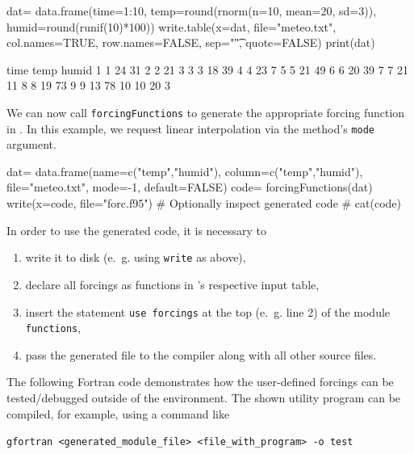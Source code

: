 \documentclass[times,onecolumn]{article}
\begin{document}
\begin{Schunk}
\begin{Sinput}
 dat= data.frame(time=1:10, temp=round(rnorm(n=10, mean=20, sd=3)),
   humid=round(runif(10)*100))
 write.table(x=dat, file="meteo.txt", col.names=TRUE,
   row.names=FALSE, sep="\t", quote=FALSE)
 print(dat)
\end{Sinput}
\begin{Soutput}
   time temp humid
1     1   24    31
2     2   21     3
3     3   18    39
4     4   23     7
5     5   21    49
6     6   20    39
7     7   21    11
8     8   19    73
9     9   13    78
10   10   20     3
\end{Soutput}
\end{Schunk}

We can now call \verb|forcingFunctions| to generate the  appropriate forcing function in . In this example, we request linear interpolation via the method's \verb|mode| argument.

\begin{Schunk}
\begin{Sinput}
 dat= data.frame(name=c("temp","humid"),
   column=c("temp","humid"), file="meteo.txt", mode=-1, default=FALSE)
 code= forcingFunctions(dat)
 write(x=code, file="forc.f95")
 # Optionally inspect generated code
 # cat(code)
\end{Sinput}
\end{Schunk}

In order to use the generated code, it is necessary to
\begin{enumerate}
\item write it to disk (e.~g. using \verb|write| as above),
\item declare all forcings as functions in 's respective input table,
\item insert the statement \verb|use forcings| at the top (e.~g. line 2) of the  module \verb|functions|,
\item pass the generated file to the compiler along with all other  source files.
\end{enumerate}

The following Fortran code demonstrates how the user-defined forcings can be tested/debugged outside of the  environment. The shown utility program can be compiled, for example, using a command like

\medskip
\verb|gfortran <generated_module_file> <file_with_program> -o test|
\end{document}
